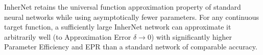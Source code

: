 \documentclass{article} %
\begin{document}
\begin{corollary}\label{cor:universal_}
InherNet retains the universal function approximation property of standard neural networks while using asymptotically fewer parameters. For any continuous target function, a sufficiently large InherNet network can approximate it arbitrarily well (to Approximation Error $\delta \to 0$) with significantly higher Parameter Efficiency and EPR than a standard network of comparable accuracy.
\end{corollary}




\end{document}
